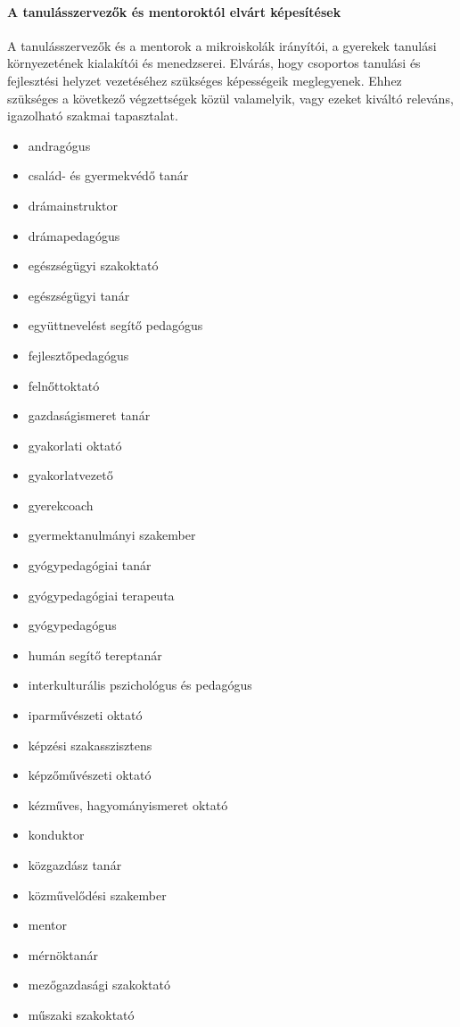 \paragraph{A tanulásszervezők és mentoroktól elvárt képesítések} A tanulásszervezők és a mentorok a mikroiskolák irányítói, a gyerekek tanulási környezetének kialakítói és menedzserei. Elvárás, hogy csoportos tanulási és fejlesztési helyzet vezetéséhez szükséges képességeik meglegyenek. Ehhez szükséges a következő végzettségek közül valamelyik, vagy ezeket kiváltó releváns, igazolható szakmai tapasztalat.
\begin{itemize}
\item andragógus
\item család- és gyermekvédő tanár
\item drámainstruktor
\item drámapedagógus
\item egészségügyi szakoktató
\item egészségügyi tanár
\item együttnevelést segítő pedagógus
\item fejlesztőpedagógus
\item felnőttoktató
\item gazdaságismeret tanár
\item gyakorlati oktató
\item gyakorlatvezető
\item gyerekcoach
\item gyermektanulmányi szakember
\item gyógypedagógiai tanár
\item gyógypedagógiai terapeuta
\item gyógypedagógus
\item humán segítő tereptanár
\item interkulturális pszichológus és pedagógus
\item iparművészeti oktató
\item képzési szakasszisztens
\item képzőművészeti oktató
\item kézműves, hagyományismeret oktató
\item konduktor
\item közgazdász tanár
\item közművelődési szakember
\item mentor
\item mérnöktanár
\item mezőgazdasági szakoktató
\item műszaki szakoktató

\end{itemize}
